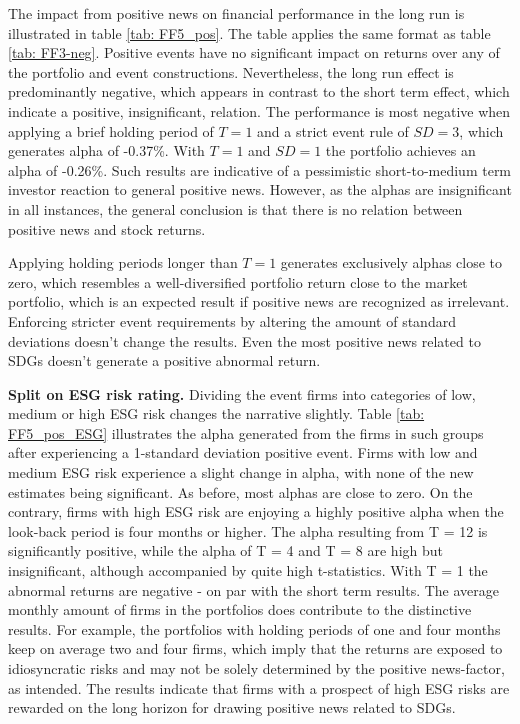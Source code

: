 The impact from positive news on financial performance in the long run is illustrated in table \ref{tab: FF5_pos}. The table applies the same format as table \ref{tab: FF3-neg}. Positive events have no significant impact on returns over any of the portfolio and event constructions. Nevertheless, the long run effect is predominantly negative, which appears in contrast to the short term effect, which indicate a positive, insignificant, relation. The performance is most negative when applying a brief holding period of $T=1$ and a strict event rule of $SD = 3$, which generates alpha of -0.37\%. With $T=1$ and $SD=1$ the portfolio achieves an alpha of -0.26\%.   
Such results are indicative of a pessimistic short-to-medium term investor reaction to general positive news. However, as the alphas are insignificant in all instances, the general conclusion is that there is no relation between positive news and stock returns.  

Applying holding periods longer than $T=1$ generates exclusively alphas close to zero, which resembles a well-diversified portfolio return close to the market portfolio, which is an expected result if positive news are recognized as irrelevant. Enforcing stricter event requirements by altering the amount of standard deviations doesn't change the results. Even the most positive news related to SDGs doesn't generate a positive abnormal return. 




\textbf{Split on ESG risk rating.}
Dividing the event firms into categories of low, medium or high ESG risk changes the narrative slightly. Table \ref{tab: FF5_pos_ESG} illustrates the alpha generated from the firms in such groups after experiencing a 1-standard deviation positive event. Firms with low and medium ESG risk experience a slight change in alpha, with none of the new estimates being significant. As before, most alphas are close to zero. On the contrary, firms with high ESG risk are enjoying a highly positive alpha when the look-back period is four months or higher. The alpha resulting from T = 12 is significantly positive, while the alpha of T = 4 and T = 8 are high but insignificant, although accompanied by quite high t-statistics. With T = 1 the abnormal returns are negative - on par with the short term results. 
The average monthly amount of firms in the portfolios does contribute to the distinctive results. For example, the portfolios with holding periods of one and four months keep on average two and four firms, which imply that the returns are exposed to idiosyncratic risks and may not be solely determined by the positive news-factor, as intended. The results indicate that firms with a prospect of high ESG risks are rewarded on the long horizon for drawing positive news related to SDGs.



